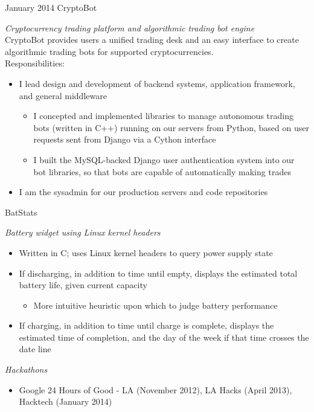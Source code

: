 \documentclass[]{mills-cv} %
\begin{document}
\begin{entrylist}
\entry
{January 2014}
{CryptoBot}
{}
{\emph{Cryptocurrency trading platform and algorithmic trading bot engine} \\
CryptoBot provides users a unified trading desk and an easy interface to create algorithmic trading bots for supported cryptocurrencies. \\
Responsibilities:
\begin{itemize}
\item I lead design and development of backend systems, application framework, and general middleware
\begin{itemize}
\item I concepted and implemented libraries to manage autonomous trading bots (written in C++) running on our servers from Python, based on user requests sent from Django via a Cython interface
\item I built the MySQL-backed Django user authentication system into our bot libraries, so that bots are capable of automatically making trades 
\end{itemize}
\item I am the sysadmin for our production servers and code repositories
\end{itemize}
}

\entry
{}
{BatStats}
{}
{\emph{Battery widget using Linux kernel headers}
\begin{itemize}
\item Written in C; uses Linux kernel headers to query power supply state
\item If discharging, in addition to time until empty, displays the estimated total battery life, given current capacity
\begin{itemize}
\item More intuitive heuristic upon which to judge battery performance
\end{itemize}
\item If charging, in addition to time until charge is complete, displays the estimated time of completion, and the day of the week if that time crosses the date line
\end{itemize}
\emph{Hackathons}
\begin{itemize}
\item Google 24 Hours of Good - LA (November 2012), LA Hacks (April 2013), \\ Hacktech (January 2014)
\end{itemize}}
\end{entrylist}
\end{document}
